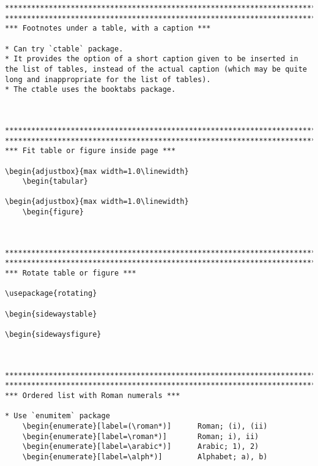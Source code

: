\documentclass{article}
\begin{document}
\begin{lstlisting}[language={[LaTeX]TeX}, caption={Alternative short names.}]
*********************************************************************************************
*********************************************************************************************
*** Footnotes under a table, with a caption ***

* Can try `ctable` package.
* It provides the option of a short caption given to be inserted in the list of tables, instead of the actual caption (which may be quite long and inappropriate for the list of tables).
* The ctable uses the booktabs package.



*********************************************************************************************
*********************************************************************************************
*** Fit table or figure inside page ***

\begin{adjustbox}{max width=1.0\linewidth}
	\begin{tabular}

\begin{adjustbox}{max width=1.0\linewidth}
	\begin{figure}



*********************************************************************************************
*********************************************************************************************
*** Rotate table or figure ***

\usepackage{rotating}

\begin{sidewaystable}

\begin{sidewaysfigure}



*********************************************************************************************
*********************************************************************************************
*** Ordered list with Roman numerals ***

* Use `enumitem` package
	\begin{enumerate}[label=(\roman*)]		Roman; (i), (ii)
	\begin{enumerate}[label=\roman*)]		Roman; i), ii)
	\begin{enumerate}[label=\arabic*)]		Arabic; 1), 2)
	\begin{enumerate}[label=\alph*)]		Alphabet; a), b)




\end{lstlisting}
\end{document}
